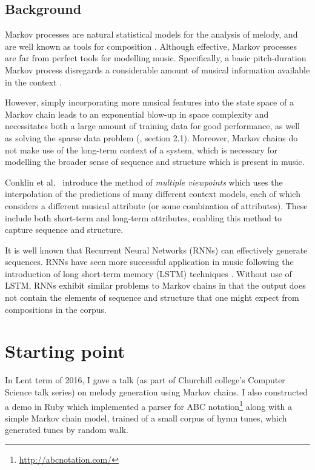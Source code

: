 \documentclass[12pt,a4paper,twoside]{article}
\begin{document}
\subsection*{Background}

Markov processes are natural statistical models for the analysis of melody, and
are well known as tools for composition \cite{ames1989markov}. Although
effective, Markov processes are far from perfect tools for modelling music.
Specifically, a basic pitch-duration Markov process disregards a considerable
amount of musical information available in the context
\cite{conklin1995viewpoints}.  

However, simply incorporating more musical features into the state space of a
Markov chain leads to an exponential blow-up in space complexity and
necessitates both a large amount of training data for good performance, as well
as solving the sparse data problem (\cite{conklin2003music}, section 2.1).
Moreover, Markov chains do not make use of the long-term context of a system,
which is necessary for modelling the broader sense of sequence and structure
which is present in music.

Conklin et al.\ \cite{conklin1995viewpoints} introduce the method of
\emph{multiple viewpoints} which uses the interpolation of the predictions of
many different context models, each of which considers a different musical
attribute (or some combination of attributes). These include both short-term and
long-term attributes, enabling this method to capture sequence and structure.

It is well known that Recurrent Neural Networks (RNNs) can effectively generate
sequences. RNNs have seen more successful application in music following the
introduction of long short-term memory (LSTM) techniques \cite{eck2002lstm}.
Without use of LSTM, RNNs exhibit similar problems to Markov chains in that the
output does not contain the elements of sequence and structure that one might
expect from compositions in the corpus.

\section*{Starting point}

In Lent term of 2016, I gave a talk (as part of Churchill college's Computer
Science talk series) on melody generation using Markov chains. I also
constructed a demo in Ruby which implemented a parser for ABC
notation\footnote{\url{http://abcnotation.com/}} along with a simple Markov
chain model, trained of a small corpus of hymn tunes, which generated tunes by
random walk. 
\end{document}
